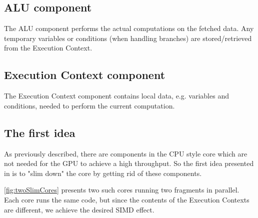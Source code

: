 \subsection{\gls{ALU} component}
The \gls{ALU} component performs the actual computations on the fetched data. Any temporary variables or conditions (when handling branches) are stored/retrieved from the Execution Context.

\subsection{Execution Context component}
The Execution Context component contains local data, e.g. variables and conditions, needed to perform the current computation.

\subsection{The first idea}
As previously described, there are components in the \gls{CPU} style core which are not needed for the \gls{GPU} to achieve a high throughput.
So the first idea presented in \cite{intro_to_gpu_arch} is to "slim down" the core by getting rid of these components.


\ref{fig:twoSlimCores} presents two such cores running two fragments in parallel. Each core runs the same code, but since the contents of the Execution Contexts are different, we achieve the desired \gls{SIMD} effect.

